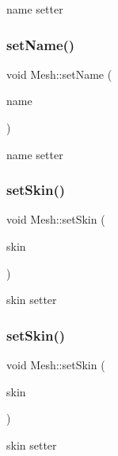name setter \mbox{\label{classMesh_ab944b018efbf265dc7555d793e50b4fd}} 
\subsubsection{\texorpdfstring{set\+Name()}{setName()}\hspace{0.1cm}{\footnotesize\ttfamily [2/2]}}
{\footnotesize\ttfamily void Mesh\+::set\+Name (\begin{DoxyParamCaption}\item[{const std\+::string \&}]{name }\end{DoxyParamCaption})\hspace{0.3cm}{\ttfamily [inline]}}

name setter \mbox{\label{classMesh_a5af01fd336373b86c3f3f092f7eb03ec}} 
\subsubsection{\texorpdfstring{set\+Skin()}{setSkin()}\hspace{0.1cm}{\footnotesize\ttfamily [1/2]}}
{\footnotesize\ttfamily void Mesh\+::set\+Skin (\begin{DoxyParamCaption}\item[{\hyperlink{classMeshSkin}{Mesh\+Skin} $\ast$}]{skin }\end{DoxyParamCaption})}

skin setter \mbox{\label{classMesh_a5af01fd336373b86c3f3f092f7eb03ec}} 
\subsubsection{\texorpdfstring{set\+Skin()}{setSkin()}\hspace{0.1cm}{\footnotesize\ttfamily [2/2]}}
{\footnotesize\ttfamily void Mesh\+::set\+Skin (\begin{DoxyParamCaption}\item[{\hyperlink{classMeshSkin}{Mesh\+Skin} $\ast$}]{skin }\end{DoxyParamCaption})}

skin setter \mbox{\label{classMesh_a2840f1e3e43c12acf51af1e34398a9a2}} 
